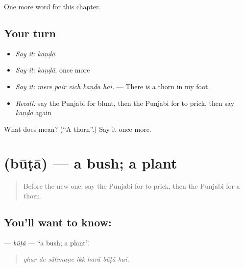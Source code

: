 \begin{grammarlens}[title={What you've built}]
One more word for this chapter.
\end{grammarlens}

\subsection*{Your turn}
\begin{itemize}
\raggedright
  \item \emph{Say it:} \emph{kaṇḍā}
  \item \emph{Say it:} \emph{kaṇḍā}, once more
  \item \emph{Say it:} \emph{mere pair vich kaṇḍā hai.} — There is a thorn in my foot.
  \item \emph{Recall:} say the Punjabi for blunt, then the Punjabi for to prick, then say \emph{kaṇḍā} again
\end{itemize}

\begin{tcolorbox}[breakable,colback=teal!4,colframe=teal!35!black,title={Before you move on}]
What does  mean? (\textquotedblleft{}A thorn\textquotedblright{}.) Say it once more.
\end{tcolorbox}
\section[\texorpdfstring{\pa{ਬੂਟਾ} (būṭā)}{ਬੂਟਾ (būṭā)}]{ (būṭā) — a bush; a plant}

\label{lesson:PA-C298-buta}



\begin{quote}
Before the new one: say the Punjabi for to prick, then the Punjabi for a thorn.
\end{quote}

\subsection*{You'll want to know: }
\textbf{} — \emph{būṭā} — \textquotedblleft{}a bush; a plant\textquotedblright{}.

\begin{quote}
      
\end{quote}

\begin{quote}
\emph{ghar de sāhmaṇe ikk harā būṭā hai.}
\end{quote}

